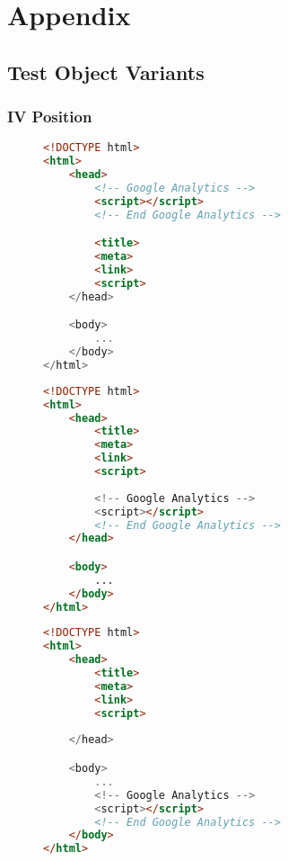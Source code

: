 \chapter{Appendix}

\section{Test Object Variants}


\subsection{IV Position}

\begin{sidewaysfigure}
\begin{multicols}{3}
\begin{center}
\begin{lstlisting}[caption={Position top-head}, language=html, numbers=none]
<!DOCTYPE html>
<html>
    <head>
        <!-- Google Analytics -->
        <script></script>
        <!-- End Google Analytics -->

        <title>
        <meta>
        <link>
        <script>
    </head>

    <body>
        ...
    </body>
</html>
\end{lstlisting}
\end{center}

\columnbreak

\begin{center}
\begin{lstlisting}[caption={Position bottom-head}, language=html, numbers=none]
<!DOCTYPE html>
<html>
    <head>
        <title>
        <meta>
        <link>
        <script>
        
        <!-- Google Analytics -->
        <script></script>
        <!-- End Google Analytics -->
    </head>

    <body>
        ...
    </body>
</html>
\end{lstlisting}
\end{center}

\columnbreak

\begin{center}
\begin{lstlisting}[caption={Position bottom-body}, language=html, numbers=none]
<!DOCTYPE html>
<html>
    <head>
        <title>
        <meta>
        <link>
        <script>
        
    </head>

    <body>
        ...
        <!-- Google Analytics -->
        <script></script>
        <!-- End Google Analytics -->
    </body>
</html>
\end{lstlisting}
\end{center}
\end{multicols}
\end{sidewaysfigure}


